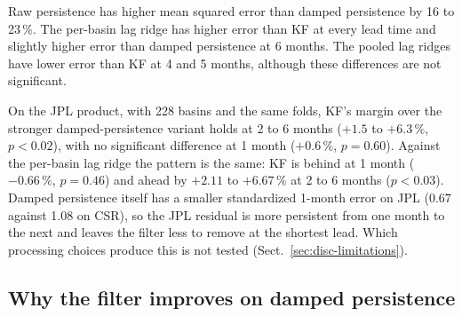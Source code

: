 \documentclass[hess, manuscript]{copernicus}
\begin{document}
Raw persistence has higher mean squared error than damped persistence by
16 to 23\,\%. The per-basin lag ridge has
higher error than KF at every lead time and slightly higher error than
damped persistence at 6 months. The pooled lag ridges have lower error
than KF at 4 and 5 months, although these differences are not significant.

On the JPL product, with 228 basins and the same folds, KF's margin over
the stronger damped-persistence variant holds at 2 to 6 months
($+1.5$ to $+6.3\,\%$, $p < 0.02$), with no significant difference at 1 month ($+0.6\,\%$,
$p = 0.60$). Against the per-basin lag ridge the pattern is the same: KF
is behind at 1 month
($-0.66\,\%$, $p = 0.46$) and ahead by $+2.11$ to $+6.67\,\%$ at 2 to 6
months ($p < 0.03$). Damped persistence itself
has a smaller standardized 1-month error on JPL
(0.67 against 1.08 on CSR), so the JPL residual is more persistent from
one month to the next and leaves the filter less to remove at the shortest
lead. Which processing choices produce this is not tested
(Sect.~\ref{sec:disc-limitations}).

\subsection{Why the filter improves on damped persistence}
\label{sec:results-mechanism}
\end{document}
